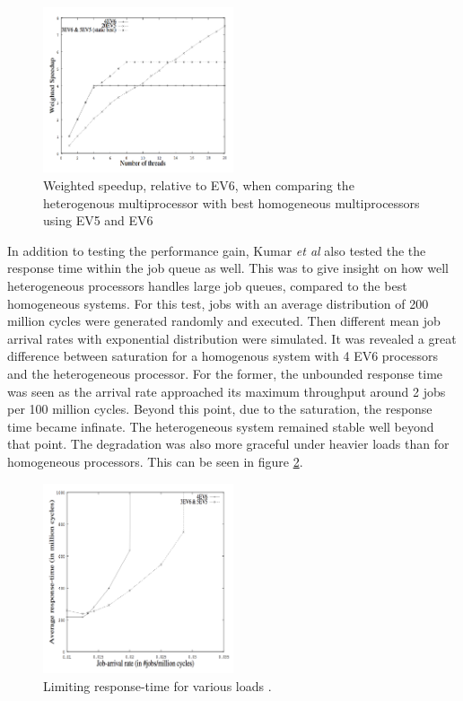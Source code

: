\begin{figure}[htb]
    \centering
    \includegraphics[width=0.5\textwidth]{Figures/Heterogeneous/Kumar2}
    \caption{Weighted speedup, relative to EV6, when comparing the heterogenous multiprocessor with best homogeneous multiprocessors using EV5 and EV6 \cite{heterogeneous-perf}}
    \label{fig:Kumar2}
\end{figure}

In addition to testing the performance gain, Kumar \textit{et al} also tested the the response time within the job queue as well.
This was to give insight on how well heterogeneous processors handles large job queues, compared to the best homogeneous systems.
For this test, jobs with an average distribution of 200 million cycles were generated randomly and executed.
Then different mean job arrival rates with exponential distribution were simulated.
It was revealed a great difference between saturation for a homogenous system with 4 EV6 processors and the heterogeneous processor.
For the former, the unbounded response time was seen as the arrival rate approached its maximum throughput around 2 jobs per 100 million cycles.
Beyond this point, due to the saturation, the response time became infinate. %
The heterogeneous system remained stable well beyond that point.
The degradation was also more graceful under heavier loads than for homogeneous processors.
This can be seen in figure \ref{fig:Kumar3}.

\begin{figure}[htb]
    \centering
    \includegraphics[width=0.5\textwidth]{Figures/Heterogeneous/Kumar3}
    \caption{Limiting response-time for various loads \cite{heterogeneous-perf}.}
    \label{fig:Kumar3}
\end{figure}

